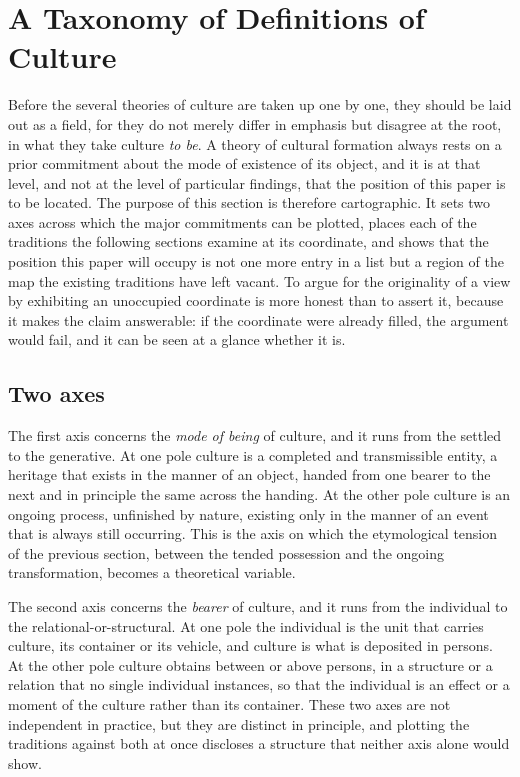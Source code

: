 \section{A Taxonomy of Definitions of Culture}
\label{p24:sec:taxonomy}

\noindent
Before the several theories of culture are taken up one by one, they should be laid out as a field, for they do not merely differ in emphasis but disagree at the root, in what they take culture \emph{to be}. A theory of cultural formation always rests on a prior commitment about the mode of existence of its object, and it is at that level, and not at the level of particular findings, that the position of this paper is to be located. The purpose of this section is therefore cartographic. It sets two axes across which the major commitments can be plotted, places each of the traditions the following sections examine at its coordinate, and shows that the position this paper will occupy is not one more entry in a list but a region of the map the existing traditions have left vacant. To argue for the originality of a view by exhibiting an unoccupied coordinate is more honest than to assert it, because it makes the claim answerable: if the coordinate were already filled, the argument would fail, and it can be seen at a glance whether it is.

\subsection*{Two axes}

The first axis concerns the \emph{mode of being} of culture, and it runs from the settled to the generative. At one pole culture is a completed and transmissible entity, a heritage that exists in the manner of an object, handed from one bearer to the next and in principle the same across the handing. At the other pole culture is an ongoing process, unfinished by nature, existing only in the manner of an event that is always still occurring. This is the axis on which the etymological tension of the previous section, between the tended possession and the ongoing transformation, becomes a theoretical variable.

The second axis concerns the \emph{bearer} of culture, and it runs from the individual to the relational-or-structural. At one pole the individual is the unit that carries culture, its container or its vehicle, and culture is what is deposited in persons. At the other pole culture obtains between or above persons, in a structure or a relation that no single individual instances, so that the individual is an effect or a moment of the culture rather than its container. These two axes are not independent in practice, but they are distinct in principle, and plotting the traditions against both at once discloses a structure that neither axis alone would show.

